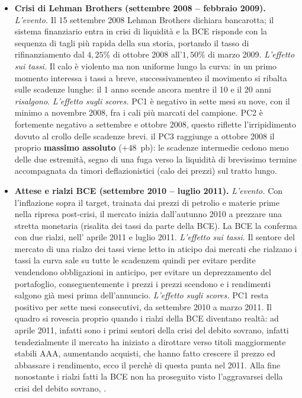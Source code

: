 \documentclass[11pt,a4paper]{article}
\theoremstyle{plain}
\theoremstyle{definition}
\theoremstyle{remark}
\begin{document}
\begin{itemize}
  \item \textbf{Crisi di Lehman Brothers (settembre 2008 -- febbraio 2009).}
        \emph{L'evento.} Il 15 settembre 2008 Lehman Brothers dichiara
        bancarotta; il sistema finanziario entra in crisi di liquidità e la
        BCE risponde con la sequenza di tagli più rapida della sua storia,
        portando il tasso di rifinanziamento dal $4{,}25\%$ di ottobre 2008
        all'$1{,}50\%$ di marzo 2009.
        \emph{L'effetto sui tassi.} Il calo è violento ma non uniforme lungo
        la curva: in un primo momento interessa i tassi a breve, successivamenteo
         il movimento si ribalta sulle scadenze lunghe: il 1 anno scende
        ancora mentre il 10 e il 20 anni \emph{risalgono}.
        \emph{L'effetto sugli scores.} PC1 è negativo in sette mesi su nove,
        con il minimo a novembre 2008, fra i cali più marcati del
        campione. PC2 è fortemente negativo a settembre e ottobre 2008, questo riflette 
        l'irripidimento dovuto al crollo delle
        scadenze brevi. il PC3 raggiunge a ottobre 2008 il proprio
        \textbf{massimo assoluto} ($+48$~pb): le scadenze intermedie cedono
        meno delle due estremità, segno di una fuga verso la liquidità di
        brevissimo termine accompagnata da timori deflazionistici (calo dei prezzi) sul tratto
        lungo.

  \item \textbf{Attese e rialzi BCE (settembre 2010 -- luglio 2011).}
        \emph{L'evento.} Con l'inflazione sopra il target, trainata
        dai prezzi di petrolio e materie prime nella ripresa post-crisi, il
        mercato inizia dall'autunno 2010 a prezzare una stretta monetaria (risalita dei tassi da parte della BCE).
        La BCE la conferma con due rialzi, nell' aprile 2011 e luglio 2011.
        \emph{L'effetto sui tassi.} Il sentore del mercato di una rialzo dei tassi
         viene letto in aticipo dai mercati che rialzano i tassi
        la curva sale su tutte le scadenzem quindi per evitare perdite
        vendendono obbligazioni in anticipo, per evitare un deprezzamento del portafoglio, conseguentemente i prezzi
        i prezzi scendono e i rendimenti salgono già mesi prima
        dell'annuncio.
        \emph{L'effetto sugli scores.} PC1 resta positivo per sette mesi
        consecutivi, da settembre 2010 a marzo 2011. 
        Il quadro si rovescia proprio quando i rialzi della BCE diventano
        realtà: ad aprile 2011, infatti sono i primi sentori della
        crisi del debito sovrano, infatti tendezialmente il mercato ha iniziato a dirottare verso titoli
        maggiormente stabili AAA, aumentando acquisti, che hanno fatto crescere il prezzo ed abbassare i rendimento, ecco il perchè di questa punta nel 2011. 
        Alla fine nonostante i rialzi fatti la BCE non ha proseguito visto l'aggravarsei della crisi del debito sovrano,
.


\end{itemize}
\end{document}
